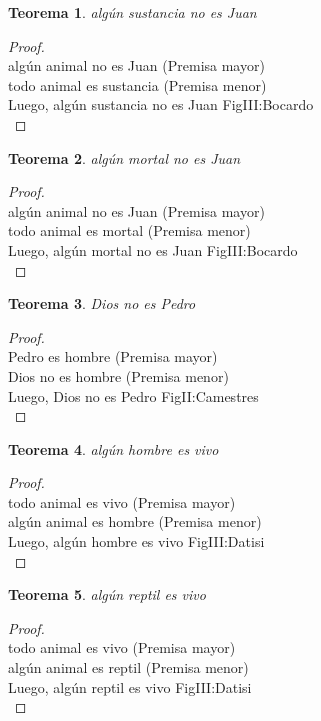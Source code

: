 ﻿\documentclass[12pt]{book}
\newtheorem{theorem}{Teorema}[chapter]
\newtheorem{proof}{Demostración}
\begin{document}
\begin{theorem}
algún sustancia no es Juan
\label{th: 92}
\end{theorem}\begin{proof}\\algún animal no es Juan	 (Premisa mayor) \\todo animal es sustancia	 (Premisa menor) \\Luego, algún sustancia no es Juan	FigIII:Bocardo \\ \end{proof}
\begin{theorem}
algún mortal no es Juan
\label{th: 93}
\end{theorem}\begin{proof}\\algún animal no es Juan	 (Premisa mayor) \\todo animal es mortal	 (Premisa menor) \\Luego, algún mortal no es Juan	FigIII:Bocardo \\ \end{proof}
\begin{theorem}
Dios no es Pedro
\label{th: 94}
\end{theorem}\begin{proof}\\Pedro es hombre	 (Premisa mayor) \\Dios no es hombre	 (Premisa menor) \\Luego, Dios no es Pedro	FigII:Camestres \\ \end{proof}
\begin{theorem}
algún hombre es vivo
\label{th: 95}
\end{theorem}\begin{proof}\\todo animal es vivo	 (Premisa mayor) \\algún animal es hombre	 (Premisa menor) \\Luego, algún hombre es vivo	FigIII:Datisi \\ \end{proof}
\begin{theorem}
algún reptil es vivo
\label{th: 96}
\end{theorem}\begin{proof}\\todo animal es vivo	 (Premisa mayor) \\algún animal es reptil	 (Premisa menor) \\Luego, algún reptil es vivo	FigIII:Datisi \\ \end{proof}
\end{document}

